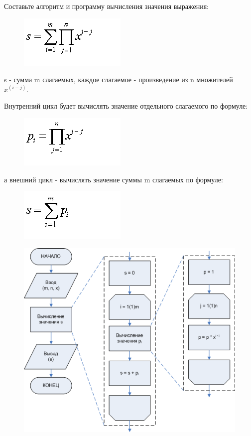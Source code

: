 \documentclass{beamer}
\begin{document}
\begin{frame}
Составьте алгоритм и программу вычисления значения выражения: 
\begin{figure}[h]
\centering
\includegraphics[scale=0.5]{images/lec04-pic14.png}
\end{figure}
s - сумма m слагаемых, каждое слагаемое - произведение из n множителей $x^(i-j)$.

Внутренний цикл будет вычислять значение отдельного слагаемого по формуле:
\begin{figure}[h]
\centering
\includegraphics[scale=0.5]{images/lec04-pic15.png}
\end{figure}
а внешний цикл - вычислять значение суммы m слагаемых по формуле:
\begin{figure}[h]
\centering
\includegraphics[scale=0.5]{images/lec04-pic16.png}
\end{figure}
\end{frame}

\begin{frame}[fragile]
\begin{figure}[h]
\includegraphics[scale=0.75]{images/lec04-pic17.png}
\end{figure}
\end{frame}
\end{document}
